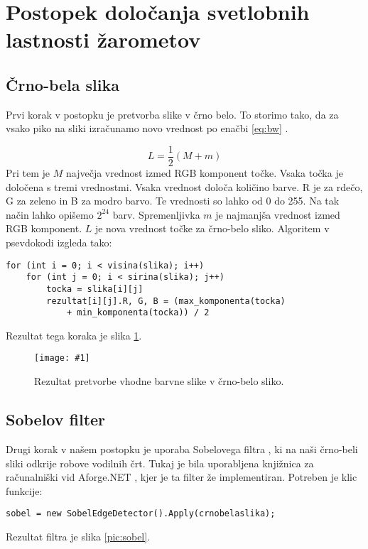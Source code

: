 \documentclass[oneside, a4paper, 12pt]{book}
\newcommand{\slika}[3]{
	\begin{figure}
	\begin{center}
	\texttt{[image: \#1]}
	\end{center}
	\vspace{-20pt}
	\caption{#2}
	\label{#3}
	\end{figure}
}
\begin{document}
\section{Postopek določanja svetlobnih lastnosti žarometov}
\subsection{Črno-bela slika}
Prvi korak v postopku je pretvorba slike v črno belo. To storimo tako, da za vsako piko na sliki izračunamo novo vrednost po enačbi \ref{eq:bw} \cite{LHS}.

\begin{equation}
L=\dfrac{1}{2}(M+m)
\label{eq:bw}
\end{equation}
Pri tem je $M$ največja vrednost izmed RGB \cite{RGB} komponent točke. Vsaka točka je določena s tremi vrednostmi. Vsaka vrednost določa količino barve. R je za rdečo, G za zeleno in B za modro barvo. Te vrednosti so lahko od 0 do 255. Na tak način lahko opišemo $2^{24}$ barv. Spremenljivka $m$ je najmanjša vrednost izmed RGB komponent. $L$ je nova vrednost točke za črno-belo sliko. Algoritem v psevdokodi izgleda tako:
\begin{samepage}
\begin{verbatim}
for (int i = 0; i < visina(slika); i++)
    for (int j = 0; i < sirina(slika); j++)
	    tocka = slika[i][j]
	    rezultat[i][j].R, G, B = (max_komponenta(tocka) 
	        + min_komponenta(tocka)) / 2
\end{verbatim}
\end{samepage}
Rezultat tega koraka je slika \ref{pic:bw}.



\slika{slike/crno-bela-slika.jpg}{Rezultat pretvorbe vhodne barvne slike v črno-belo sliko.}{pic:bw}

\subsection{Sobelov filter}
\label{ch:sobel}
Drugi korak v našem postopku je uporaba Sobelovega filtra \cite{sobel-wiki}, ki na naši črno-beli sliki odkrije robove vodilnih črt. Tukaj je bila uporabljena knjižnica za računalniški vid Aforge.NET \cite{sobel}, kjer je ta filter že implementiran. Potreben je klic funkcije:
\begin{samepage}
\begin{verbatim}
sobel = new SobelEdgeDetector().Apply(crnobelaslika);
\end{verbatim}
\end{samepage}
Rezultat filtra je slika \ref{pic:sobel}.
\end{document}
